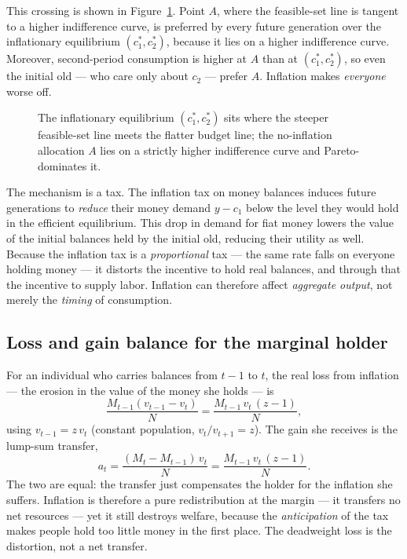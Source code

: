 

This crossing is shown in Figure~\ref{fig:money-4}. Point $A$, where the feasible-set line is tangent to a higher indifference curve, is preferred by every future generation over the inflationary equilibrium $(c_1^*,c_2^*)$, because it lies on a higher indifference curve. Moreover, second-period consumption is higher at $A$ than at $(c_1^*,c_2^*)$, so even the initial old --- who care only about $c_2$ --- prefer $A$. Inflation makes \emph{everyone} worse off.

\begin{figure}[h]
\centering

\caption{The inflationary equilibrium $(c_1^*,c_2^*)$ sits where the steeper feasible-set line meets the flatter budget line; the no-inflation allocation $A$ lies on a strictly higher indifference curve and Pareto-dominates it.}
\label{fig:money-4}
\end{figure}

The mechanism is a tax. The inflation tax on money balances induces future generations to \emph{reduce} their money demand $y - c_1$ below the level they would hold in the efficient equilibrium. This drop in demand for fiat money lowers the value of the initial balances held by the initial old, reducing their utility as well. Because the inflation tax is a \emph{proportional} tax --- the same rate falls on everyone holding money --- it distorts the incentive to hold real balances, and through that the incentive to supply labor. Inflation can therefore affect \emph{aggregate output}, not merely the \emph{timing} of consumption.

\subsection*{Loss and gain balance for the marginal holder}

For an individual who carries balances from $t-1$ to $t$, the real loss from inflation --- the erosion in the value of the money she holds --- is
\[
\frac{M_{t-1}(v_{t-1} - v_t)}{N} = \frac{M_{t-1}\,v_t\,(z-1)}{N},
\]
using $v_{t-1} = z\,v_t$ (constant population, $v_t/v_{t+1}=z$). The gain she receives is the lump-sum transfer,
\[
a_t = \frac{(M_t - M_{t-1})\,v_t}{N} = \frac{M_{t-1}\,v_t\,(z-1)}{N}.
\]
The two are equal: the transfer just compensates the holder for the inflation she suffers. Inflation is therefore a pure redistribution at the margin --- it transfers no net resources --- yet it still destroys welfare, because the \emph{anticipation} of the tax makes people hold too little money in the first place. The deadweight loss is the distortion, not a net transfer.

